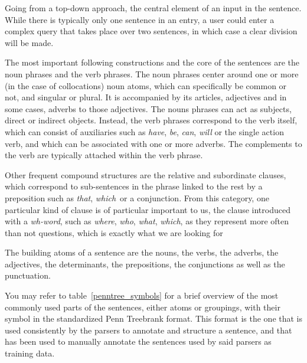Going from a top-down approach, the central element of an input in the sentence. While there is typically only one sentence in an entry, a user could enter a complex query that takes place over two sentences, in which case a clear division will be made.

The most important following constructions and the core of the sentences are the noun phrases and the verb phrases. The noun phrases center around one or more (in the case of collocations) noun atoms, which can specifically be common or not, and singular or plural. It is accompanied by its articles, adjectives and in some cases, adverbs to those adjectives. The nouns phrases can act as subjects, direct or indirect objects. Instead, the verb phrases correspond to the verb itself, which can consist of auxiliaries such as \emph{have}, \emph{be}, \emph{can}, \emph{will} or the single action verb, and which can be associated with one or more adverbs. The complements to the verb are typically attached within the verb phrase.

Other frequent compound structures are the relative and subordinate clauses, which correspond to sub-sentences in the phrase linked to the rest by a preposition such as \emph{that}, \emph{which}\ or a conjunction. From this category, one particular kind of clause is of particular important to us, the clause introduced with a \emph{wh-word}, such as \emph{where}, \emph{who}, \emph{what}, \emph{which}, as they represent more often than not questions, which is exactly what we are looking for

The building atoms of a sentence are the nouns, the verbs, the adverbs, the adjectives, the determinants, the prepositions, the conjunctions as well as the punctuation.

You may refer to table~\ref{penntree_symbols} for a brief overview of the most commonly used parts of the sentences, either atoms or groupings, with their symbol in the standardized Penn Treebrank format. This format is the one that is used consistently by the parsers to annotate and structure a sentence, and that has been used to manually annotate the sentences used by said parsers as training data.

